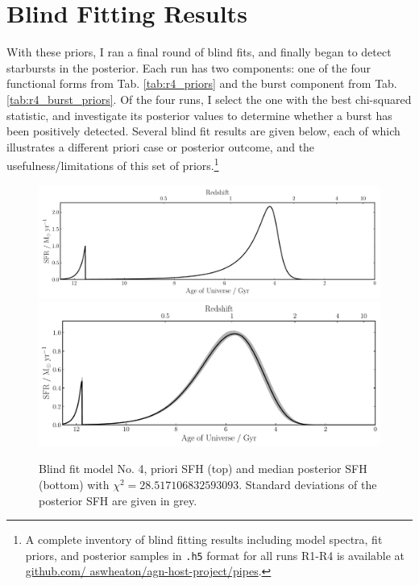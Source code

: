 \documentclass[a4paper,12pt]{article}
\begin{document}

\section{Blind Fitting Results}\label{sec:blind_fitting_results}

With these priors, I ran a final round of blind fits, and finally began to
detect starbursts in the posterior. Each run has two components: one of the
four functional forms from Tab. \ref{tab:r4_priors} and the burst component
from Tab. \ref{tab:r4_burst_priors}. Of the four runs, I select the one with
the best chi-squared statistic, and investigate its posterior values to
determine whether a burst has been positively detected. Several blind fit
results are given below, each of which illustrates a different priori case or
posterior outcome, and the usefulness/limitations of this set of
priors.\footnote{A complete inventory of blind fitting results including model
spectra, fit priors, and posterior samples
in \texttt{.h5} format for all runs R1-R4 is available at \url{github.com/
aswheaton/agn-host-project/pipes}.}

\begin{figure}[h]
  \includegraphics[width=\textwidth]{../pipes/plots/r0_priors/phil_model_4_sfh}
  \includegraphics[width=\textwidth]{../pipes/plots/r4_lognormal_burst/phil_model_4_sfh}
  \caption{
  Blind fit model No. 4, priori SFH (top) and median posterior SFH (bottom)
  with $\chi^2=28.517106832593093$. Standard deviations of the posterior SFH
  are given in grey.
  }
  \label{fig:phil_model_4_sfhs}
\end{figure}
\end{document}
